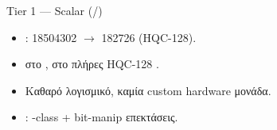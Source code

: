 \begin{frame}{Tier 1 — Scalar (\Zbc/\Zbb)}
  \begin{itemize}
    \item {}: \num{18504302} $\rightarrow$ \num{182726} \instret (HQC-128).
    \item {} στο ,  στο πλήρες HQC-128 .
    \item Καθαρό λογισμικό, καμία custom hardware μονάδα.
    \item {}: -class  + bit-manip επεκτάσεις.
  \end{itemize}
\end{frame}
